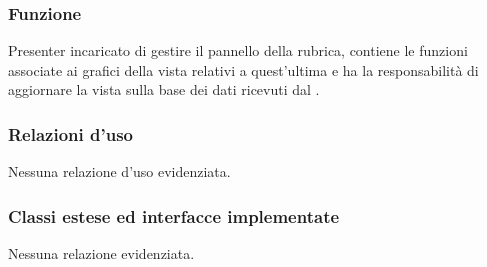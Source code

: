 
\subsubsection*{Funzione}
Presenter incaricato di gestire il pannello della rubrica, contiene le funzioni associate ai  grafici della vista relativi a quest'ultima e ha la responsabilità di aggiornare la vista sulla base dei dati ricevuti dal .

\subsubsection*{Relazioni d'uso}
Nessuna relazione d'uso evidenziata.

\subsubsection*{Classi estese ed interfacce implementate}
Nessuna relazione evidenziata.

